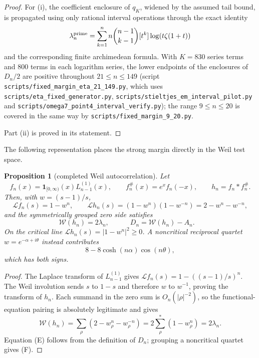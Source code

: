 \documentclass[11pt]{amsart}
\newtheorem{proposition}[theorem]{Proposition}
\theoremstyle{definition}
\theoremstyle{remark}
\theoremstyle{definition}
\begin{document}
\begin{proof}
For (i), the coefficient enclosure of $q_K$, widened by the assumed tail bound, is propagated using only rational interval operations through
the exact identity
\[
 \lambda_n^{\rm prime}
 =\sum_{k=1}^n n\binom{n-1}{k-1}[t^k]\log(t\zeta(1+t))
\]
and the corresponding finite archimedean formula.  With $K=830$ series terms and $800$ terms in each
logarithm series, the
lower endpoints of the enclosures of $D_n/2$ are positive throughout $21\le n\le149$ (script
\texttt{scripts/fixed\_margin\_eta\_21\_149.py}, which uses
\texttt{scripts/eta\_fixed\_generator.py}, \texttt{scripts/stieltjes\_em\_interval\_pilot.py} and
\texttt{scripts/omega7\_point4\_interval\_verify.py}); the range $9\le n\le20$ is covered in the
same way by \texttt{scripts/fixed\_margin\_9\_20.py}.

Part (ii) is proved in its statement.
\end{proof}

The following representation places the strong margin directly in the Weil test space.

\begin{proposition}[completed Weil autocorrelation]\label{prop:completed-weil-autocorrelation}
Let
\[
 f_n(x)=\mathbf1_{[0,\infty)}(x)L_{n-1}^{(1)}(x),\qquad
 f_n^\#(x)=e^xf_n(-x),\qquad h_n=f_n*f_n^\#.
\]
Then, with $w=(s-1)/s$,
\[
 \mathcal Lf_n(s)=1-w^n,\qquad
 \mathcal Lh_n(s)=(1-w^n)(1-w^{-n})=2-w^n-w^{-n},
\]
and the symmetrically grouped zero side satisfies
\[
 \mathcal W(h_n)=2\lambda_n,\qquad
 \boxed{\quad D_n=\mathcal W(h_n)-A_n.\quad}                 \tag{E}
\]
On the critical line $\mathcal Lh_n(s)=|1-w^n|^2\ge0$.  A noncritical reciprocal quartet
$w=e^{-\alpha+i\theta}$ instead contributes
\[
 8-8\cosh(n\alpha)\cos(n\theta),                              \tag{F}
\]
which has both signs.
\end{proposition}

\begin{proof}
The Laplace transform of $L_{n-1}^{(1)}$ gives
$\mathcal Lf_n(s)=1-((s-1)/s)^n$.  The Weil involution sends $s$ to $1-s$ and therefore $w$ to
$w^{-1}$, proving the transform of $h_n$.  Each summand in the zero sum is $O_n(|\rho|^{-2})$, so the
functional-equation pairing is absolutely legitimate and gives
\[
 \mathcal W(h_n)=\sum_\rho(2-w_\rho^n-w_\rho^{-n})
 =2\sum_\rho^*(1-w_\rho^n)=2\lambda_n.
\]
Equation (E) follows from the definition of $D_n$; grouping a noncritical quartet gives (F).
\end{proof}
\end{document}
